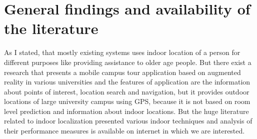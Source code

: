\section {General findings and availability of the literature}

As I stated, that mostly existing systems uses indoor location of a person for different purposes like providing assistance to older age people. But there exist a research\cite{AR} that presents a mobile campus tour application based on augmented reality in various universities and the features of application are the information about points of interest, location search and navigation, but it provides outdoor locations of large university campus using GPS, because it is not based on room level prediction and information about indoor locations. But the huge literature related to indoor localization presented various indoor techniques and analysis of their performance measures is available on internet in which we are interested.  

